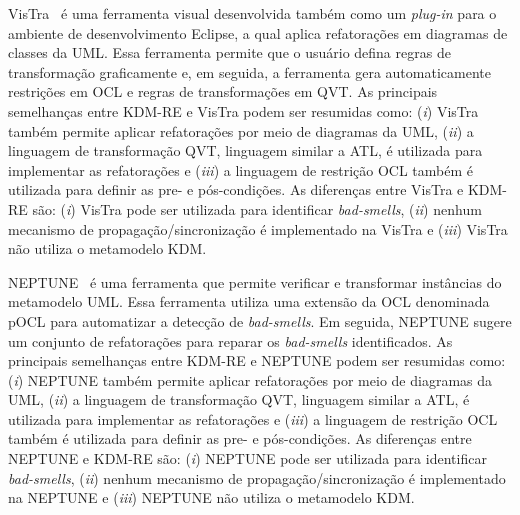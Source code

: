VisTra~\cite{vstolc2010visual} é uma ferramenta visual desenvolvida também como um \textit{plug-in} para o ambiente de desenvolvimento Eclipse, a qual aplica refatorações em diagramas de classes da UML. Essa ferramenta permite que o usuário defina regras de transformação graficamente e, em seguida, a ferramenta gera automaticamente restrições em OCL e regras de transformações em QVT. As principais semelhanças entre KDM-RE e VisTra podem ser resumidas como: (\textit{i}) VisTra também permite aplicar refatorações por meio de diagramas da UML, (\textit{ii}) a linguagem de transformação QVT, linguagem similar a ATL, é utilizada para implementar as refatorações e (\textit{iii}) a linguagem de restrição OCL também é utilizada para definir as pre- e pós-condições. As diferenças entre VisTra e KDM-RE são: (\textit{i}) VisTra pode ser utilizada para identificar \textit{bad-smells}, (\textit{ii}) nenhum mecanismo de propagação/sincronização é implementado na VisTra e (\textit{iii}) VisTra não utiliza o metamodelo KDM.


NEPTUNE~\cite{millan2009ocl} é uma ferramenta que permite verificar e transformar instâncias do metamodelo UML. Essa ferramenta utiliza uma extensão da OCL denominada pOCL para automatizar a detecção de \textit{bad-smells}. Em seguida, NEPTUNE sugere um conjunto de refatorações para reparar os \textit{bad-smells} identificados. As principais semelhanças entre KDM-RE e NEPTUNE podem ser resumidas como: (\textit{i}) NEPTUNE também permite aplicar refatorações por meio de diagramas da UML, (\textit{ii}) a linguagem de transformação QVT, linguagem similar a ATL, é utilizada para implementar as refatorações e (\textit{iii}) a linguagem de restrição OCL também é utilizada para definir as pre- e pós-condições. As diferenças entre NEPTUNE e KDM-RE são: (\textit{i}) NEPTUNE pode ser utilizada para identificar \textit{bad-smells}, (\textit{ii}) nenhum mecanismo de propagação/sincronização é implementado na NEPTUNE e (\textit{iii}) NEPTUNE não utiliza o metamodelo KDM.

